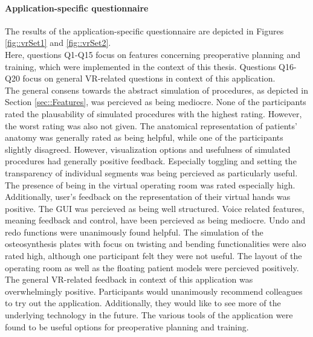 \paragraph{Application-specific questionnaire}
The results of the application-specific questionnaire are depicted
in Figures \ref{fig::vrSet1} and \ref{fig::vrSet2}.
\\ Here, questions Q1-Q15 focus on features concerning
preoperative planning and training, 
which were implemented in the context of this thesis.
Questions Q16-Q20 focus on general VR-related
questions in context of this application.
\\ The general consens towards the abstract simulation of procedures,
as depicted in Section \ref{sec::Features}, was percieved as 
being mediocre. None of the participants rated the plausability
of simulated procedures with the highest rating.
However, the worst rating was also not given. The anatomical 
representation of patients' anatomy was generally rated as being
helpful, while one of the participants slightly disagreed. 
However, visualization options and usefulness of simulated procedures
had generally positive feedback. Especially toggling and setting the 
transparency of individual segments was being percieved as particularly
useful.
The presence of being in the virtual operating room was rated
especially high. Additionally, user's feedback on the representation
of their virtual hands was positive. 
The GUI was percieved as being well structured.
Voice related features, meaning feedback and control, have been
percieved as being mediocre. 
Undo and redo functions were unanimously found helpful.
The simulation of the osteosynthesis plates with focus on
twisting and bending functionalities were also rated high,
although one participant felt they were not useful.
The layout of the operating room as well as the floating patient
models were percieved positively. 
\\ The general VR-related feedback in context of this application
was overwhelmingly positive. 
Participants would unanimously recommend colleagues to try
out the application. Additionally, they would like to see
more of the underlying technology in the future.
The various tools of the application were found to be 
useful options
for preoperative planning and training.

